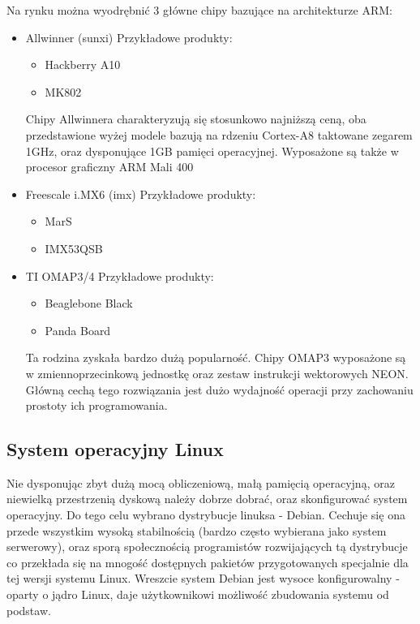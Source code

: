Na rynku można wyodrębnić 3 główne chipy bazujące na architekturze ARM:
\begin{itemize}
	\item Allwinner (sunxi)
	Przykładowe produkty:
	\begin{itemize}
		\item Hackberry A10
		\item MK802
	\end{itemize}

	Chipy Allwinnera charakteryzują się stosunkowo najniższą ceną, oba przedstawione wyżej modele bazują na rdzeniu Cortex-A8 taktowane zegarem 1GHz, oraz dysponujące 1GB pamięci operacyjnej. Wyposażone są także w procesor graficzny ARM Mali 400
	
	\item Freescale i.MX6 (imx)
	Przykładowe produkty:
	\begin{itemize}
		\item MarS
		\item IMX53QSB
	\end{itemize}
	\item TI OMAP3/4
	Przykładowe produkty:
		\begin{itemize}
			\item Beaglebone Black
			\item Panda Board
		\end{itemize}
	Ta rodzina zyskała bardzo dużą popularność. Chipy OMAP3 wyposażone są w zmiennoprzecinkową jednostkę oraz zestaw instrukcji wektorowych NEON. Główną cechą tego rozwiązania jest dużo wydajność operacji przy zachowaniu prostoty ich programowania.
\end{itemize}



\subsection{System operacyjny Linux}

Nie dysponując zbyt dużą mocą obliczeniową, małą pamięcią operacyjną, oraz niewielką przestrzenią dyskową należy dobrze dobrać, oraz skonfigurować system operacyjny. Do tego celu wybrano dystrybucje linuksa - Debian. Cechuje się ona przede wszystkim wysoką stabilnością (bardzo często wybierana jako system serwerowy), oraz sporą społecznością programistów rozwijających tą dystrybucje co przekłada się na mnogość dostępnych pakietów przygotowanych specjalnie dla tej wersji systemu Linux. Wreszcie system Debian jest wysoce konfigurowalny - oparty o jądro Linux, daje użytkownikowi możliwość zbudowania systemu od podstaw.

